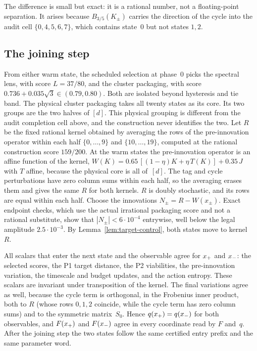 The difference is small but exact: it is a rational number, not a floating-point separation. It arises because $B_{3/5}(K_\pm)$ carries the direction of the cycle into the audit cell $\{0,4,5,6,7\}$, which contains state~$0$ but not states $1,2$.

\subsection{The joining step}

From either warm state, the scheduled selection at phase~$0$ picks the spectral lens, with score $L=37/80$, and the cluster packaging, with score $0.736+0.035\sqrt3\in(0.79,0.80)$. Both are isolated beyond hysteresis and tie band. The physical cluster packaging takes all twenty states as its core. Its two groups are the two halves of $[d]$. This physical grouping is different from the audit completion cell above, and the construction never identifies the two. Let $R$ be the fixed rational kernel obtained by averaging the rows of the pre-innovation operator within each half $\{0,\dots,9\}$ and $\{10,\dots,19\}$, computed at the rational construction score $159/200$. At the warm states the pre-innovation operator is an affine function of the kernel, $W(K)=0.65\,[(1-\eta)K+\eta\,T(K)]+0.35\,J$ with $T$ affine, because the physical core is all of~$[d]$. The tag and cycle perturbations have zero column sums within each half, so the averaging erases them and gives the same $R$ for both kernels. $R$ is doubly stochastic, and its rows are equal within each half. Choose the innovations $N_\pm=R-W(x_\pm)$. Exact endpoint checks, which use the actual irrational packaging score and not a rational substitute, show that $|N_\pm|<6\cdot10^{-4}$ entrywise, well below the legal amplitude $2.5\cdot10^{-3}$. By Lemma~\ref{lem:target-control}, both states move to kernel~$R$.

All scalars that enter the next state and the observable agree for $x_{+}$ and $x_{-}$: the selected scores, the P1 target distance, the P2 viabilities, the pre-innovation variation, the timescale and budget updates, and the action entropy. These scalars are invariant under transposition of the kernel. The final variations agree as well, because the cycle term is orthogonal, in the Frobenius inner product, both to $R$ (whose rows $0,1,2$ coincide, while the cycle term has zero column sums) and to the symmetric matrix~$S_0$. Hence
$q(x_{+})=q(x_{-})$ for both observables, and $F(x_{+})$ and $F(x_{-})$ agree in every coordinate read by $F$ and~$q$.
After the joining step the two states follow the same certified entry prefix and the same parameter word.

